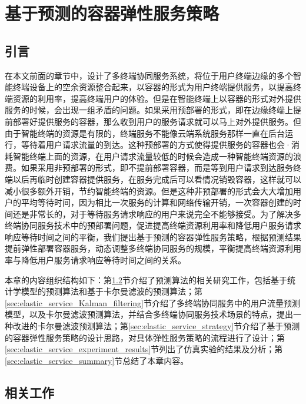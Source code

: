 \chapter{基于预测的容器弹性服务策略 }\label{chap:elastic_service}

\section{引言}

在本文前面的章节中，设计了多终端协同服务系统，将位于用户终端边缘的多个智能终端设备上的空余资源整合起来，以容器的形式为用户终端提供服务，以提高终端资源的利用率，提高终端用户的体验。但是在智能终端上以容器的形式对外提供服务的时候，会出现一组矛盾的问题。如果采用预部署的形式，即在边缘终端上提前部署好提供服务的容器，那么收到用户的服务请求就可以马上对外提供服务。但由于智能终端的资源是有限的，终端服务不能像云端系统服务那样一直在后台运行，等待着用户请求流量的到达。这种预部署的方式使得提供服务的容器也会·消耗智能终端上面的资源，在用户请求流量较低的时候会造成一种智能终端资源的浪费。如果采用非预部署的形式，即不提前部署容器，而是等到用户请求到达服务终端以后再临时创建容器提供服务，在服务完成后可以看情况销毁容器，这样就可以减小很多额外开销，节约智能终端的资源。但是这种非预部署的形式会大大增加用户的平均等待时间，因为相比一次服务的计算和网络传输开销，一次容器创建的时间还是非常长的，对于等待服务请求响应的用户来说完全不能够接受。为了解决多终端协同服务技术中的预部署问题，促进提高终端资源利用率和降低用户服务请求响应等待时间之间的平衡，我们提出基于预测的容器弹性服务策略，根据预测结果提前弹性部署容器服务，动态调整多终端协同服务的规模，平衡提高终端资源利用率与降低用户服务请求响应等待时间之间的关系。

本章的内容组织结构如下：第\ref{sec:elastic_service_related_work}节介绍了预测算法的相关研究工作，包括基于统计学模型的预测算法和基于卡尔曼滤波的预测算法；第\ref{sec:elastic_service_Kalman_filtering}节介绍了多终端协同服务中的用户流量预测模型，以及卡尔曼滤波预测算法，并结合多终端协同服务技术场景的特点，提出一种改进的卡尔曼滤波预测算法；第\ref{sec:elastic_service_strategy}节介绍了基于预测的容器弹性服务策略的设计思路，对具体弹性服务策略的流程进行了设计；第\ref{sec:elastic_service_experiment_results}节列出了仿真实验的结果及分析；第\ref{sec:elastic_service_summary}节总结了本章内容。

\section{相关工作}\label{sec:elastic_service_related_work}

